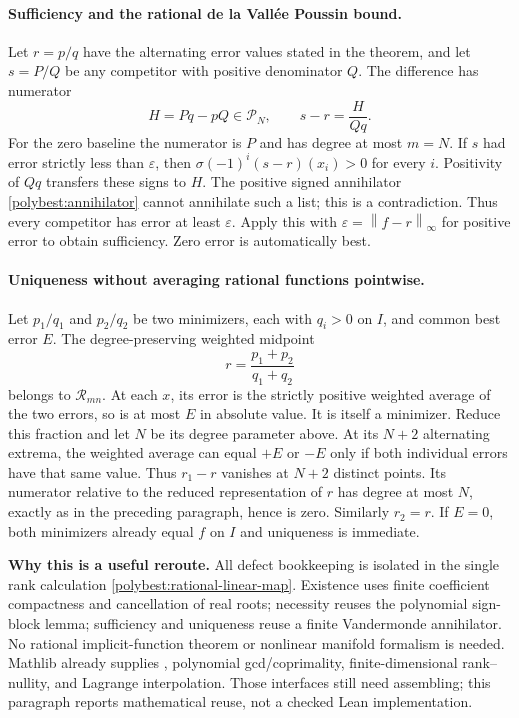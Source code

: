 \documentclass[11pt]{article}
\newcommand{\norm}[1]{\left\lVert #1\right\rVert}
\newcommand{\code}[1]{\ifmmode\text{\small\nolinkurl{#1}}\else{\small\nolinkurl{#1}}\fi}
\theoremstyle{remark}
\numberwithin{equation}{section}
\begin{document}
\paragraph{Sufficiency and the rational de la Vall\'ee Poussin bound.}
Let $r=p/q$ have the alternating error values stated in the theorem,
and let $s=P/Q$ be any competitor with positive denominator $Q$.
The difference has numerator
\[
 H=Pq-pQ\in\mathcal P_N,
 \qquad s-r=\frac{H}{Qq}.
\]
For the zero baseline the numerator is $P$ and has degree at most $m=N$.
If $s$ had error strictly less than $\varepsilon$, then
$\sigma(-1)^i(s-r)(x_i)>0$ for every $i$.  Positivity of $Qq$ transfers
these signs to $H$.  The positive signed annihilator
\eqref{polybest:annihilator} cannot annihilate such a list; this is a
contradiction.  Thus every competitor has error at least $\varepsilon$.
Apply this with $\varepsilon=\norm{f-r}_\infty$ for positive error to
obtain sufficiency.  Zero error is automatically best.

\paragraph{Uniqueness without averaging rational functions pointwise.}
Let $p_1/q_1$ and $p_2/q_2$ be two minimizers, each with $q_i>0$ on
$I$, and common best error $E$.  The degree-preserving weighted midpoint
\[
 r=\frac{p_1+p_2}{q_1+q_2}
\]
belongs to $\mathcal R_{mn}$.  At each $x$, its error is the strictly
positive weighted average of the two errors, so is at most $E$ in
absolute value.  It is itself a minimizer.  Reduce this fraction and
let $N$ be its degree parameter above.  At its $N+2$ alternating extrema,
the weighted average can equal $+E$ or $-E$ only if both individual
errors have that same value.  Thus $r_1-r$ vanishes at $N+2$ distinct
points.  Its numerator relative to the reduced representation of $r$
has degree at most $N$, exactly as in the preceding paragraph, hence
is zero.  Similarly $r_2=r$.  If $E=0$, both minimizers already equal
$f$ on $I$ and uniqueness is immediate.

\textbf{Why this is a useful reroute.} All defect bookkeeping is isolated
in the single rank calculation \eqref{polybest:rational-linear-map}.
Existence uses finite coefficient compactness and cancellation of real
roots; necessity reuses the polynomial sign-block lemma; sufficiency
and uniqueness reuse a finite Vandermonde annihilator.  No rational
implicit-function theorem or nonlinear manifold formalism is needed.
Mathlib already supplies \code{RatFunc}, polynomial gcd/coprimality,
finite-dimensional rank--nullity, and Lagrange interpolation.  Those
interfaces still need assembling; this paragraph reports mathematical
reuse, not a checked Lean implementation.
\end{document}
